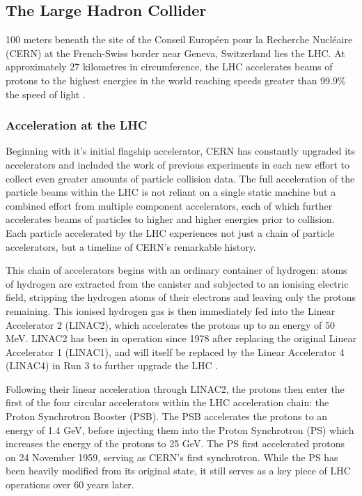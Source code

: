 \documentclass[12pt,a4paper,epsf,portrait,times,epsfig]{article}
\begin{document}
		\subsection{The Large Hadron Collider}

		100 meters beneath the site of the Conseil Européen pour la Recherche Nucléaire (CERN) at the French-Swiss border near Geneva, Switzerland lies the LHC. At approximately 27 kilometres in circumference, the LHC accelerates beams of protons to the highest energies in the world 
		reaching speeds greater than 99.9\% the speed of light \cite{LHCDesignV1, LHCDesignV2, LHCDesignV3}. 

		\subsubsection{Acceleration at the LHC}

		Beginning with it's initial flagship accelerator, CERN has constantly upgraded its accelerators and included the work of previous experiments in each new effort to collect even greater amounts of particle collision data. The full acceleration of the particle beams within the LHC is not reliant on a single static machine but a combined effort from multiple component accelerators, each of which further accelerates beams of particles to higher and higher energies prior to collision. Each particle accelerated by the LHC experiences not just a chain of particle accelerators, but a timeline of CERN's remarkable history.   
		
		This chain of accelerators begins with an ordinary container of hydrogen: atoms of hydrogen are extracted from the canister and subjected to an ionising electric field, stripping the hydrogen atoms of their electrons and leaving only the protons remaining. This ionised hydrogen gas is then immediately fed into the Linear Accelerator 2 (LINAC2), which accelerates the protons up to an energy of 50 MeV. LINAC2 has been in operation since 1978 after replacing the original Linear Accelerator 1 (LINAC1), and will itself be replaced by the Linear Accelerator 4 (LINAC4) in Run 3 to further upgrade the LHC \cite{LINAC4}. \par 
		
		Following their linear acceleration through LINAC2, the protons then enter the first of the four circular accelerators within the LHC acceleration chain: the Proton Synchrotron Booster (PSB). The PSB accelerates the protons to an energy of 1.4 GeV, before injecting them into the Proton Synchrotron (PS) which increases the energy of the protons to 25 GeV. The PS first accelerated protons on 24 November 1959, serving as CERN's first synchrotron. While the PS has been heavily modified from its original state, it still serves as a key piece of LHC operations over 60 years later. \par
\end{document}
